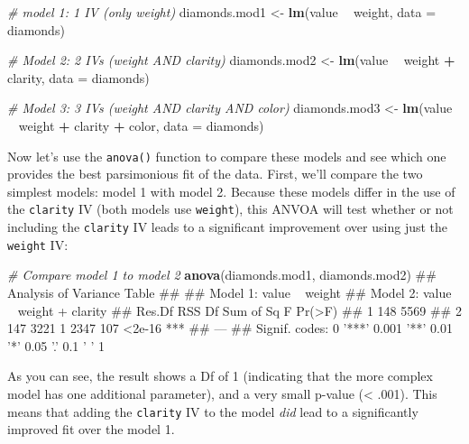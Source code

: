\documentclass[]{book}
\newenvironment{Shaded}{\begin{snugshade}}{\end{snugshade}}
\newcommand{\KeywordTok}[1]{\textcolor[rgb]{0.13,0.29,0.53}{\textbf{#1}}}
\newcommand{\DataTypeTok}[1]{\textcolor[rgb]{0.13,0.29,0.53}{#1}}
\newcommand{\StringTok}[1]{\textcolor[rgb]{0.31,0.60,0.02}{#1}}
\newcommand{\CommentTok}[1]{\textcolor[rgb]{0.56,0.35,0.01}{\textit{#1}}}
\newcommand{\OperatorTok}[1]{\textcolor[rgb]{0.81,0.36,0.00}{\textbf{#1}}}
\newcommand{\NormalTok}[1]{#1}
\theoremstyle{definition}
\theoremstyle{definition}
\theoremstyle{remark}
\begin{document}
\begin{Shaded}
\begin{Highlighting}[]
\CommentTok{# model 1: 1 IV (only weight)}
\NormalTok{ diamonds.mod1 <-}\StringTok{ }\KeywordTok{lm}\NormalTok{(value }\OperatorTok{~}\StringTok{ }\NormalTok{weight, }\DataTypeTok{data =}\NormalTok{ diamonds)}

 \CommentTok{# Model 2: 2 IVs (weight AND clarity)}
\NormalTok{ diamonds.mod2 <-}\StringTok{ }\KeywordTok{lm}\NormalTok{(value }\OperatorTok{~}\StringTok{ }\NormalTok{weight }\OperatorTok{+}\StringTok{ }\NormalTok{clarity, }\DataTypeTok{data =}\NormalTok{ diamonds)}

 \CommentTok{# Model 3: 3 IVs (weight AND clarity AND color)}
\NormalTok{ diamonds.mod3 <-}\StringTok{ }\KeywordTok{lm}\NormalTok{(value }\OperatorTok{~}\StringTok{ }\NormalTok{weight }\OperatorTok{+}\StringTok{ }\NormalTok{clarity }\OperatorTok{+}\StringTok{ }\NormalTok{color, }\DataTypeTok{data =}\NormalTok{ diamonds)}
\end{Highlighting}
\end{Shaded}

Now let's use the \texttt{anova()} function to compare these models and
see which one provides the best parsimonious fit of the data. First,
we'll compare the two simplest models: model 1 with model 2. Because
these models differ in the use of the \texttt{clarity} IV (both models
use \texttt{weight}), this ANVOA will test whether or not including the
\texttt{clarity} IV leads to a significant improvement over using just
the \texttt{weight} IV:

\begin{Shaded}
\begin{Highlighting}[]
 \CommentTok{# Compare model 1 to model 2}
 \KeywordTok{anova}\NormalTok{(diamonds.mod1, diamonds.mod2)}
\NormalTok{## Analysis of Variance Table}
\NormalTok{## }
\NormalTok{## Model 1: value ~ weight}
\NormalTok{## Model 2: value ~ weight + clarity}
\NormalTok{##   Res.Df  RSS Df Sum of Sq   F Pr(>F)    }
\NormalTok{## 1    148 5569                            }
\NormalTok{## 2    147 3221  1      2347 107 <2e-16 ***}
\NormalTok{## ---}
\NormalTok{## Signif. codes:  0 '***' 0.001 '**' 0.01 '*' 0.05 '.' 0.1 ' ' 1}
\end{Highlighting}
\end{Shaded}

As you can see, the result shows a Df of 1 (indicating that the more
complex model has one additional parameter), and a very small p-value
(\textless{} .001). This means that adding the \texttt{clarity} IV to
the model \emph{did} lead to a significantly improved fit over the model
1.
\end{document}
